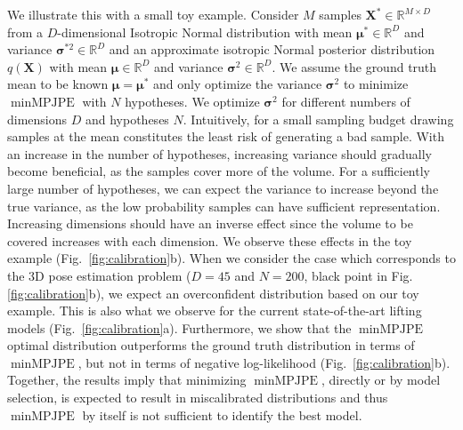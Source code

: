 \documentclass{article} \usepackage{iclr2023_conference,times}
\def\vmu{{\bm{\mu}}}
\def\vsigma{{\bm{\sigma}}}
\def\mX{{\bm{X}}}
\newcommand{\R}{\mathbb{R}}
\begin{document}
    We illustrate this with a small toy example.
    Consider $M$ samples $\mX^* \in \R^{M\times D}$ from a $D$-dimensional Isotropic Normal distribution with mean $\vmu^{*} \in \mathbb{R}^D$ and variance $\vsigma^{*2} \in \mathbb{R}^D$ and an approximate isotropic Normal posterior distribution $q(\mX)$ with mean $\vmu \in \mathbb{R}^D$ and variance $\vsigma^2 \in \mathbb{R}^D$.
    We assume the ground truth mean to be known $\vmu = \vmu^{*}$ and only optimize the variance $\vsigma^2$ to minimize $\operatorname{minMPJPE}$ with $N$ hypotheses.
    We optimize $\vsigma^2$ for different numbers of dimensions $D$ and hypotheses $N$.
    Intuitively, for a small sampling budget drawing samples at the mean constitutes the least risk of generating a bad sample.
    With an increase in the number of hypotheses, increasing variance should gradually become beneficial, as the samples cover more of the volume.
    For a sufficiently large number of hypotheses, we can expect the variance to increase beyond the true variance, as the low probability samples can have sufficient representation.
    Increasing dimensions should have an inverse effect since the volume to be covered increases with each dimension.
    We observe these effects in the toy example (Fig.~\ref{fig:calibration}b).
    When we consider the case which corresponds to the 3D pose estimation problem ($D = 45$ and $N = 200$, black point in Fig. \ref{fig:calibration}b), we expect an overconfident distribution based on our toy example.
    This is also what we observe for the current state-of-the-art lifting models (Fig.~\ref{fig:calibration}a).
    Furthermore, we show that the $\operatorname{minMPJPE}$ optimal distribution outperforms the ground truth distribution in terms of $\operatorname{minMPJPE}$, but not in terms of negative log-likelihood (Fig.~\ref{fig:calibration}b).
    Together, the results imply that minimizing $\operatorname{minMPJPE}$, directly or by model selection, is expected to result in miscalibrated distributions and thus $\operatorname{minMPJPE}$ by itself is not sufficient to identify the best model.
    
\end{document}
